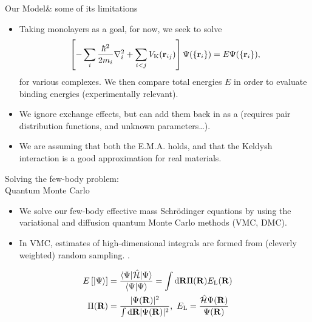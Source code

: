 \documentclass[12pt, pdf, hyperref={draft}, usenames, dvipsnames]{beamer}
\newcommand{\dd}{\mathrm{d}}
\newcommand{\ket}[1]{\lvert{#1}\rangle}
\newcommand{\bra}[1]{\langle{#1}\rvert}
\newcommand{\red}[1]{{\bf\color{LancsRed}{#1}}}
\newcommand{\blue}[1]{{\bf\color{NavyBlue}{#1}}}
\begin{document}
\begin{frame}{Our Model}{\& some of its limitations}
\begin{itemize}
  \item Taking monolayers as a goal, for now, we seek to solve
  \begin{equation}
      \left[-\sum_i\dfrac{\hbar^2}{2m_i}\nabla^2_i + \sum_{i<j}V_{\text{K}}({\bf
      r}_{ij})\right]\Psi(\{{\bf r}_i\}) = E\Psi(\{{\bf r}_i\}),
  \end{equation}
  for various complexes. We then compare total energies $E$ in order to
  evaluate binding energies (experimentally relevant).

  \item We ignore exchange effects, but can add
  them back in as a \blue{perturbative correction} (requires pair distribution
  functions, and unknown parameters\ldots).

  \item We are assuming that both the E.M.A. holds, and that the Keldysh
  interaction is a good approximation for real materials.
\end{itemize}
\end{frame}


\begin{frame}{Solving the few-body problem:\\ Quantum Monte Carlo}
\begin{itemize}
  \item We solve our few-body effective mass Schr\"{o}dinger equations by using
  the variational and diffusion quantum Monte Carlo methods (VMC, DMC).
  \item In VMC, estimates of high-dimensional integrals are formed from
  (cleverly weighted) random sampling. \red{The results are as good as the trial
  wave function}.
\end{itemize}
\begin{align}
  E\left[\ket{\Psi}\right] &= \dfrac{\bra{\Psi} \mathcal{\hat H}
  \ket{\Psi}}{\bra{\Psi}\Psi \rangle} = \displaystyle\int \dd{\bf R} \Pi({\bf
  R}) E_{\text{L}}({\bf R}) \nonumber \\
  \Pi({\bf R}) &= \dfrac{\lvert\Psi({\bf R}) \rvert^2}{\int\dd{\bf R}\lvert
  \Psi({\bf R})\rvert^2},\ E_{\text{L}} = \dfrac{\mathcal{\hat H} \Psi({\bf R})}{\Psi({\bf R})}
\end{align}
\end{frame}
\end{document}
